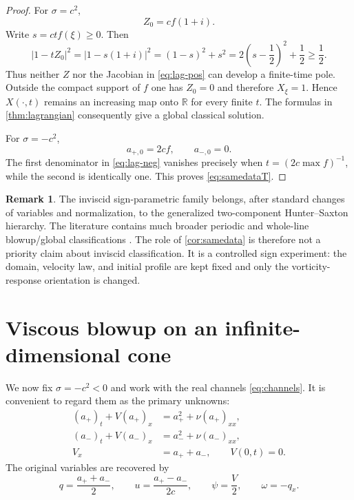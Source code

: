 \documentclass[11pt]{article}
\theoremstyle{definition}
\newtheorem{remark}[theorem]{Remark}
\newcommand{\R}{\mathbb R}
\begin{document}
\begin{proof}
For $\sigma=c^2$,
\[
 Z_0=cf(1+i).
\]
Write $s=ctf(\xi)\ge0$.  Then
\[
 |1-tZ_0|^2=|1-s(1+i)|^2=(1-s)^2+s^2
 =2\left(s-\frac12\right)^2+\frac12\ge\frac12.
\]
Thus neither $Z$ nor the Jacobian in \eqref{eq:lag-pos} can develop a finite-time pole.  Outside the compact support of $f$ one has $Z_0=0$ and therefore $X_\xi=1$.  Hence $X(\cdot,t)$ remains an increasing map onto $\R$ for every finite $t$.  The formulas in \cref{thm:lagrangian} consequently give a global classical solution.

For $\sigma=-c^2$,
\[
 a_{+,0}=2cf,
 \qquad a_{-,0}=0.
\]
The first denominator in \eqref{eq:lag-neg} vanishes precisely when $t=(2c\max f)^{-1}$, while the second is identically one.  This proves \eqref{eq:samedataT}.
\end{proof}

\begin{remark}
The inviscid sign-parametric family belongs, after standard changes of variables and normalization, to the generalized two-component Hunter--Saxton hierarchy.  The literature contains much broader periodic and whole-line blowup/global classifications \cite{Wunsch2010,WuWunsch2012,MoonLiu2012,Sarria2015}.  The role of \cref{cor:samedata} is therefore not a priority claim about inviscid classification.  It is a controlled sign experiment: the domain, velocity law, and initial profile are kept fixed and only the vorticity-response orientation is changed.
\end{remark}

\section{Viscous blowup on an infinite-dimensional cone}\label{sec:viscous}

We now fix $\sigma=-c^2<0$ and work with the real channels \eqref{eq:channels}.  It is convenient to regard them as the primary unknowns:
\begin{equation}\label{eq:twochannel}
\begin{aligned}
 (a_+)_t+V(a_+)_x&=a_+^2+\nu(a_+)_{xx},\\
 (a_-)_t+V(a_-)_x&=a_-^2+\nu(a_-)_{xx},\\
 V_x&=a_++a_-,\qquad V(0,t)=0.
\end{aligned}
\end{equation}
The original variables are recovered by
\begin{equation}\label{eq:recoverqu}
 q=\frac{a_++a_-}{2},
 \qquad
 u=\frac{a_+-a_-}{2c},
 \qquad
 \psi=\frac V2,
 \qquad
 \omega=-q_x.
\end{equation}
\end{document}
